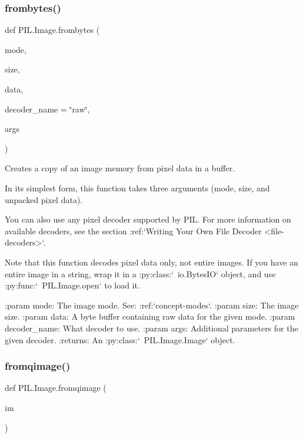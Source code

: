 \subsubsection{\texorpdfstring{frombytes()}{frombytes()}}
{\footnotesize\ttfamily def P\+I\+L.\+Image.\+frombytes (\begin{DoxyParamCaption}\item[{}]{mode,  }\item[{}]{size,  }\item[{}]{data,  }\item[{}]{decoder\+\_\+name = {\ttfamily \char`\"{}raw\char`\"{}},  }\item[{}]{args }\end{DoxyParamCaption})}

\begin{DoxyVerb}Creates a copy of an image memory from pixel data in a buffer.

In its simplest form, this function takes three arguments
(mode, size, and unpacked pixel data).

You can also use any pixel decoder supported by PIL.  For more
information on available decoders, see the section
:ref:`Writing Your Own File Decoder <file-decoders>`.

Note that this function decodes pixel data only, not entire images.
If you have an entire image in a string, wrap it in a
:py:class:`~io.BytesIO` object, and use :py:func:`~PIL.Image.open` to load
it.

:param mode: The image mode. See: :ref:`concept-modes`.
:param size: The image size.
:param data: A byte buffer containing raw data for the given mode.
:param decoder_name: What decoder to use.
:param args: Additional parameters for the given decoder.
:returns: An :py:class:`~PIL.Image.Image` object.
\end{DoxyVerb}
 \mbox{\label{namespacePIL_1_1Image_acc7617ffb052e0a5821b7768048621e5}} 
\subsubsection{\texorpdfstring{fromqimage()}{fromqimage()}}
{\footnotesize\ttfamily def P\+I\+L.\+Image.\+fromqimage (\begin{DoxyParamCaption}\item[{}]{im }\end{DoxyParamCaption})}


